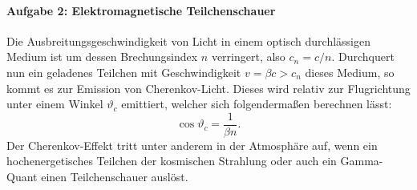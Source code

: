 \documentclass[11pt,a4paper]{scrartcl}
\begin{document}
    \newpage
    \paragraph{Aufgabe 2: Elektromagnetische Teilchenschauer}

    Die Ausbreitungsgeschwindigkeit von Licht in einem optisch durchlässigen Medium ist
    um dessen Brechungsindex $n$ verringert, also $c_n=c/n$. Durchquert nun ein geladenes
    Teilchen mit Geschwindigkeit $v=\beta c>c_n$ dieses Medium, so kommt es zur Emission
    von Cherenkov-Licht. Dieses wird relativ zur Flugrichtung unter einem Winkel
    $\vartheta_c$ emittiert, welcher sich folgendermaßen berechnen lässt:
    \[
        \cos\vartheta_c=\frac{1}{\beta n}.
    \]
    Der Cherenkov-Effekt tritt unter anderem in der Atmosphäre auf, wenn ein hochenergetisches
    Teilchen der kosmischen Strahlung oder auch ein Gamma-Quant einen Teilchenschauer auslöst.
\end{document}
